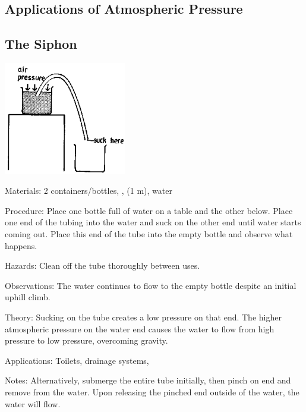 \begin{multicols}{2}
\columnbreak


\section*{Applications of Atmospheric Pressure}


\subsection{The Siphon}

\begin{center}
\includegraphics[width=0.4\textwidth]{./img/source/siphon.png}
\end{center}

\begin{description*}
\item[Materials:]{2 containers/bottles, , (1 m), water}
\item[Procedure:]{Place one bottle full of water on a table and the other below. Place one end of the tubing into the water and suck on the other end until water starts coming out. Place this end of the tube into the empty bottle and observe what happens.}
\item[Hazards:]{Clean off the tube thoroughly between uses.}
\item[Observations:]{The water continues to flow to the empty bottle despite an initial uphill climb.}
\item[Theory:]{Sucking on the tube creates a low pressure on that end. The higher atmospheric pressure on the water end causes the water to flow from high pressure to low pressure, overcoming gravity.}
\item[Applications:]{Toilets, drainage systems, }
\item[Notes:]{Alternatively, submerge the entire tube initially, then pinch on end and remove from the water. Upon releasing the pinched end outside of the water, the water will flow.}
\end{description*}


\end{multicols}

